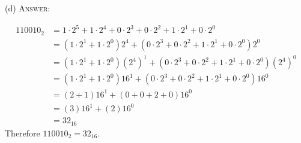 (d)
\textsc{Answer:}\vspace{-2mm}
\begin{answerlong}
\begin{align*}
110010_2 &= 1 \cdot 2^{5} + 1\cdot 2^{4} + 0 \cdot 2^{3} + 0\cdot 2^{2} + 1 \cdot 2^{1} + 0\cdot 2^{0} \\
         &= (1 \cdot 2^{1} + 1\cdot 2^{0})2^{4} + (0 \cdot 2^{3} + 0\cdot 2^{2} + 1 \cdot 2^{1} + 0\cdot 2^{0})2^{0} \\
         &= (1 \cdot 2^{1} + 1\cdot 2^{0})(2^{4})^{1} + (0 \cdot 2^{3} + 0\cdot 2^{2} + 1 \cdot 2^{1} + 0\cdot 2^{0})(2^{4})^{0} \\
         &= (1 \cdot 2^{1} + 1\cdot 2^{0})16^{1} + (0 \cdot 2^{3} + 0\cdot 2^{2} + 1 \cdot 2^{1} + 0\cdot 2^{0})16^{0} \\
         &= (2 + 1)16^{1} + (0 + 0 + 2 + 0)16^{0} \\
         &= (3)16^{1} + (2)16^{0} \\
         &= 32_{16}
\end{align*}
Therefore $110010_2 = 32_{16}$.
\end{answerlong}
